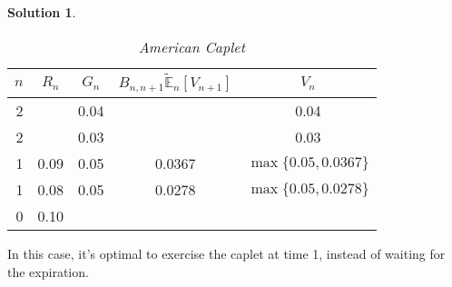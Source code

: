 \documentclass[a4paper, 10pt]{article}
\renewcommand{\arraystretch}{1.4}
\theoremstyle{definition}
\theoremstyle{hSol}
\newtheorem*{solution}{Solution}
\begin{document}
\begin{solution}
\begin{table}[H]
\vspace{-1pt}
\caption{\textit{American Caplet}}
\vspace{-7pt}
\centering
\def\arraystretch{1.15}
\begin{tabular}{|r|cccc|}
\hline
$n$ & $R_n$ & $G_n$ & $B_{n,n+1}\tilde{\mathbb{E}}_n\left[V_{n+1}\right]$ & $V_n$\\ 
\hline
2 &  & 0.04 & & 0.04\\
2 &  & 0.03 & & 0.03\\
\hline
1 & 0.09 & 0.05 & 0.0367 & $\max\{0.05, 0.0367\}$\\
1 & 0.08 & 0.05 & 0.0278 & $\max\{0.05, 0.0278\}$\\
\hline
0 & 0.10 &  &  & \\
\hline
\end{tabular}
\label{tab:cbc2}
\end{table}
In this case, it's optimal to exercise the caplet at time 1, instead of waiting for the expiration.
~\\
\end{solution}
\end{document}
